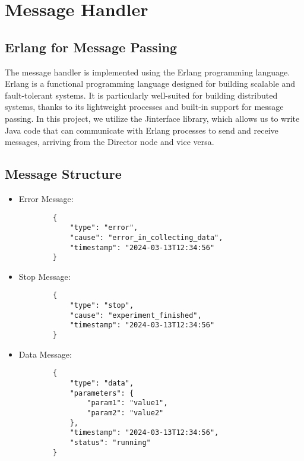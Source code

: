 \section{Message Handler}

\subsection{Erlang for Message Passing}
The message handler is implemented using the Erlang programming language. Erlang is a functional programming language designed for building scalable and fault-tolerant systems. It is particularly well-suited for building distributed systems, thanks to its lightweight processes and built-in support for message passing. In this project, we utilize the Jinterface library, which allows us to write Java code that can communicate with Erlang processes to send and receive messages, arriving from the Director node and vice versa.

\subsection{Message Structure}
\begin{itemize}
    \item Error Message:
    \begin{verbatim}
        {
            "type": "error",
            "cause": "error_in_collecting_data",
            "timestamp": "2024-03-13T12:34:56"
        }
    \end{verbatim}
    
    \item Stop Message:
    \begin{verbatim}
        {
            "type": "stop",
            "cause": "experiment_finished",
            "timestamp": "2024-03-13T12:34:56"
        }
    \end{verbatim}
    
    \item Data Message:
    \begin{verbatim}
        {
            "type": "data",
            "parameters": {
                "param1": "value1",
                "param2": "value2"
            },
            "timestamp": "2024-03-13T12:34:56",
            "status": "running"
        }
    \end{verbatim}
\end{itemize}

